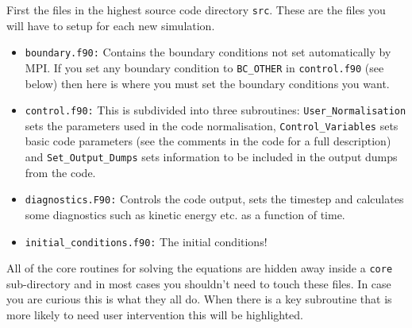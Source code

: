 \documentclass[11pt]{article}
\begin{document}
First the files in the highest source code directory \texttt{src}. These are the files you will have to setup for each new simulation.
\begin{itemize}
 \item{\texttt{boundary.f90:}} Contains the boundary conditions not set automatically by MPI. If you set any boundary condition to \texttt{BC\_OTHER} in \texttt{control.f90} (see below) then here is where you must set the boundary conditions you want.
  \item{\texttt{control.f90:}} This is subdivided into three subroutines: \texttt{User\_Normalisation} sets the parameters used in the code normalisation, \texttt{Control\_Variables} sets basic code parameters  (see the comments in the code for a full description) and
\texttt{Set\_Output\_Dumps} sets information to be included in the output dumps from the code.
 \item{\texttt{diagnostics.F90:}} Controls the code output, sets the timestep and calculates some diagnostics such as kinetic energy etc. as a function of time.
  \item{\texttt{initial\_conditions.f90:}} The initial conditions!
\end{itemize}

All of the core routines for solving the equations are hidden away inside a \texttt{core} sub-directory and in most cases you shouldn't need to touch these files. In case you are curious this is what they all do. When there is a key subroutine that is more likely to need user intervention this will be highlighted.
\end{document}
